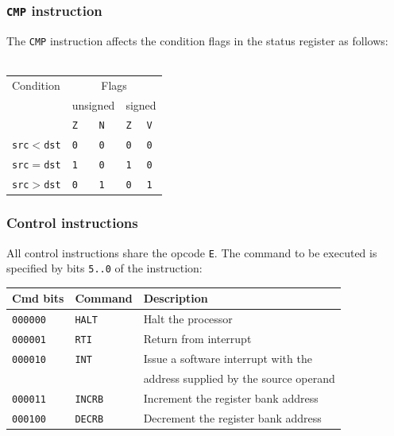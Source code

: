 \documentclass{beamer}
\begin{document}
%
   \begin{frame}
    \frametitle{\texttt{CMP} instruction}
    The \texttt{CMP} instruction affects the condition flags in the 
    status register as follows:
~\\~\\
    \begin{center}
     \begin{tabular}{|l|l|l|l|l|}
      \hline
      Condition&\multicolumn{4}{c|}{Flags}\\
               &\multicolumn{2}{c|}{unsigned}&\multicolumn{2}{c|}{signed}\\
               &\texttt{Z}&\texttt{N}&\texttt{Z}&\texttt{V}\\
      \hline
      \hline
      \texttt{src}$<$\texttt{dst}&\texttt{0}&\texttt{0}&\texttt{0}&\texttt{0}\\
      \texttt{src}$=$\texttt{dst}&\texttt{1}&\texttt{0}&\texttt{1}&\texttt{0}\\
      \texttt{src}$>$\texttt{dst}&\texttt{0}&\texttt{1}&\texttt{0}&\texttt{1}\\
      \hline
     \end{tabular}
    \end{center}
   \end{frame}
%
   \begin{frame}
    \frametitle{Control instructions}
    All control instructions share the opcode \texttt{E}. The command to be
    executed is specified by bits \texttt{5..0} of the instruction:
    \begin{center}
     \begin{tabular}{|l|l|l|}
      \hline
       Cmd bits&Command&Description\\
      \hline
      \hline
       \texttt{000000}&\texttt{HALT}&Halt the processor\\
       \texttt{000001}&\texttt{RTI}&Return from interrupt\\
       \texttt{000010}&\texttt{INT}&Issue a software interrupt with the\\
        &&address supplied by the source operand\\
       \texttt{000011}&\texttt{INCRB}&Increment the register bank address\\
       \texttt{000100}&\texttt{DECRB}&Decrement the register bank address\\
      \hline
     \end{tabular}
    \end{center}
   \end{frame}
\end{document}
